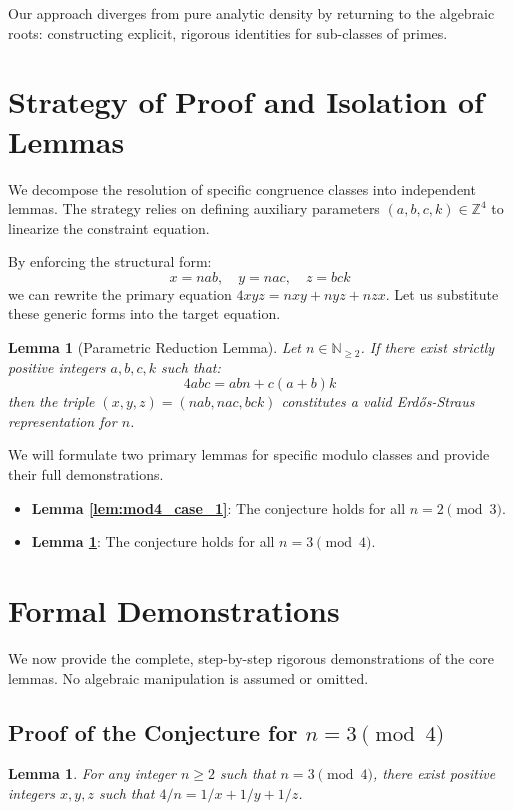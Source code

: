 \documentclass[12pt,a4paper]{article}
\newtheorem{lemma}[theorem]{Lemma}
\begin{document}
Our approach diverges from pure analytic density by returning to the algebraic roots: constructing explicit, rigorous identities for sub-classes of primes.

\newpage
\section{Strategy of Proof and Isolation of Lemmas}

We decompose the resolution of specific congruence classes into independent lemmas. The strategy relies on defining auxiliary parameters $(a, b, c, k) \in \mathbb{Z}^4$ to linearize the constraint equation.

By enforcing the structural form:
\begin{equation}
x = nab, \quad y = nac, \quad z = bck
\end{equation}
we can rewrite the primary equation $4xyz = nxy + nyz + nzx$. Let us substitute these generic forms into the target equation.

\begin{lemma}[Parametric Reduction Lemma]
\label{lem:parametric_reduction}
Let $n \in \mathbb{N}_{\geq 2}$. If there exist strictly positive integers $a, b, c, k$ such that:
\begin{equation}
4abc = abn + c(a+b)k
\end{equation}
then the triple $(x, y, z) = (nab, nac, bck)$ constitutes a valid Erd\H{o}s-Straus representation for $n$.
\end{lemma}

We will formulate two primary lemmas for specific modulo classes and provide their full demonstrations.
\begin{itemize}
\item \textbf{Lemma \ref{lem:mod4_case_1}}: The conjecture holds for all $n = 2 \pmod 3$.
\item \textbf{Lemma \ref{lem:mod4_case_2}}: The conjecture holds for all $n = 3 \pmod 4$.
\end{itemize}

\newpage
\section{Formal Demonstrations}

We now provide the complete, step-by-step rigorous demonstrations of the core lemmas. No algebraic manipulation is assumed or omitted.

\subsection{Proof of the Conjecture for $n = 3 \pmod 4$}
\begin{lemma}
\label{lem:mod4_case_2}
For any integer $n \geq 2$ such that $n = 3 \pmod 4$, there exist positive integers $x, y, z$ such that $4/n = 1/x + 1/y + 1/z$.
\end{lemma}
\end{document}
